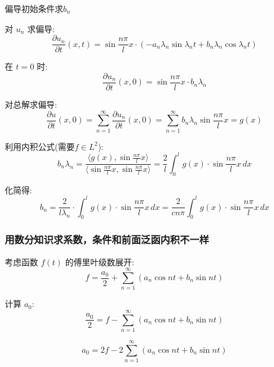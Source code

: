 \documentclass[12pt,a4paper]{article}
\numberwithin{subsection}{section}   %
\numberwithin{subsubsection}{subsection}
\theoremstyle{plain}
\theoremstyle{definition}
\theoremstyle{remark}
\theoremstyle{remark}
\begin{document}
	偏导初始条件求$b_n$
	
	对 \(u_n\) 求偏导:
	\begin{equation}
		\frac{\partial u_n}{\partial t}(x, t) = \sin \frac{n\pi}{l} x \cdot \left( -a_n \lambda_n \sin \lambda_n t + b_n \lambda_n \cos \lambda_n t \right)
	\end{equation}
	
	在 \(t = 0\) 时:
	\begin{equation}
		\frac{\partial u_n}{\partial t}(x, 0) = \sin \frac{n\pi}{l} x \cdot b_n \lambda_n
	\end{equation}
	
	对总解求偏导:
	\begin{equation}
		\frac{\partial u}{\partial t}(x, 0) = \sum_{n=1}^{\infty} \frac{\partial u_n}{\partial t}(x, 0) = \sum_{n=1}^{\infty} b_n \lambda_n \sin \frac{n\pi}{l} x = g(x)
	\end{equation}
	
	利用内积公式(需要$f \in L^2$):
	\begin{equation}
		b_n \lambda_n = \frac{\langle g(x), \sin \frac{n\pi}{l} x \rangle}{\langle \sin \frac{n\pi}{l} x, \sin \frac{n\pi}{l} x \rangle} = \frac{2}{l} \int_0^l g(x) \cdot \sin \frac{n\pi}{l} x \, dx
	\end{equation}
	
	化简得:
	\begin{equation}
		b_n = \frac{2}{l \lambda_n} \cdot \int_0^l g(x) \cdot \sin \frac{n\pi}{l} x \, dx = \frac{2}{c n \pi} \int_0^l g(x) \cdot \sin \frac{n\pi}{l} x \, dx
	\end{equation}
	
	\subsubsection{用数分知识求系数，条件和前面泛函内积不一样}
	
	考虑函数 \( f(t) \) 的傅里叶级数展开:
	\begin{equation}
		f = \frac{a_0}{2} + \sum_{n=1}^{\infty} \left( a_n \cos nt + b_n \sin nt \right)
	\end{equation}
	
	计算 \( a_0 \):
	\begin{equation}
		\frac{a_0}{2} = f - \sum_{n=1}^{\infty} \left( a_n \cos nt + b_n \sin nt \right)
	\end{equation}
	
	\begin{equation}
		a_0 = 2f - 2 \sum_{n=1}^{\infty} \left( a_n \cos nt + b_n \sin nt \right)
	\end{equation}
	
\end{document}
